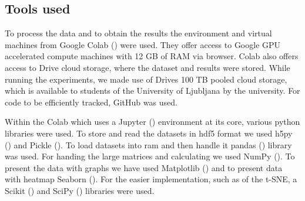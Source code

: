 \subsection{Tools used}

To process the data and to obtain the results the environment and virtual machines from Google Colab (\cite{colab}) were used.
They offer access to Google GPU accelerated compute machines with 12 GB of RAM via browser. 
Colab also offers access to Drive cloud storage, where the dataset and results were stored.
While running the experiments, we made use of Drives 100 TB pooled cloud storage, which is available to students of the University of Ljubljana by the university. 
For code to be efficiently tracked, GitHub was used. 

Within the Colab which uses a Jupyter (\cite{jupyter}) environment at its core, various python libraries were used.
To store and read the datasets in hdf5 format we used h5py  (\cite{hdf5}) and Pickle  (\cite{pickle}).
To load datasets into ram and then handle it pandas  (\cite{pandas}) library was used.
For handing the large matrices and calculating we used NumPy  (\cite{numpy}).
To present the data with graphs we have used Matplotlib  (\cite{matplotlib}) and to present data with heatmap Seaborn  (\cite{seaborn}).
For the easier implementation, such as of the t-SNE, a Scikit  (\cite{scikit}) and SciPy  (\cite{scipy}) libraries were used.
